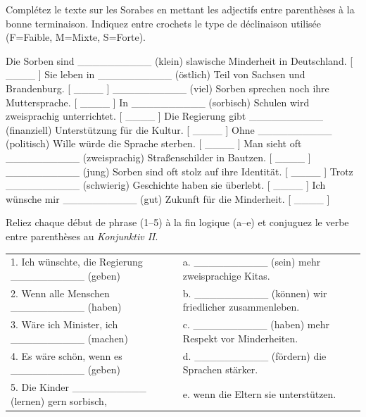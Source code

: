 \documentclass[11pt]{article}
\begin{document}
\begin{exercice}
Complétez le texte sur les Sorabes en mettant les adjectifs entre parenthèses à la bonne terminaison. Indiquez entre crochets le type de déclinaison utilisée (F=Faible, M=Mixte, S=Forte).
\begin{textebox}
Die Sorben sind \_\_\_\_\_\_\_\_\_\_ (klein) slawische Minderheit in Deutschland. [ \_\_\_\_ ]
Sie leben in \_\_\_\_\_\_\_\_\_\_ (östlich) Teil von Sachsen und Brandenburg. [ \_\_\_\_ ]
\_\_\_\_\_\_\_\_\_\_ (viel) Sorben sprechen noch ihre Muttersprache. [ \_\_\_\_ ]
In \_\_\_\_\_\_\_\_\_\_ (sorbisch) Schulen wird zweisprachig unterrichtet. [ \_\_\_\_ ]
Die Regierung gibt \_\_\_\_\_\_\_\_\_\_ (finanziell) Unterstützung für die Kultur. [ \_\_\_\_ ]
Ohne \_\_\_\_\_\_\_\_\_\_ (politisch) Wille würde die Sprache sterben. [ \_\_\_\_ ]
Man sieht oft \_\_\_\_\_\_\_\_\_\_ (zweisprachig) Straßenschilder in Bautzen. [ \_\_\_\_ ]
\_\_\_\_\_\_\_\_\_\_ (jung) Sorben sind oft stolz auf ihre Identität. [ \_\_\_\_ ]
Trotz \_\_\_\_\_\_\_\_\_\_ (schwierig) Geschichte haben sie überlebt. [ \_\_\_\_ ]
Ich wünsche mir \_\_\_\_\_\_\_\_\_\_ (gut) Zukunft für die Minderheit. [ \_\_\_\_ ]
\end{textebox}
\end{exercice}

\begin{exercice}
Reliez chaque début de phrase (1--5) à la fin logique (a--e) et conjuguez le verbe entre parenthèses au \emph{Konjunktiv II}.
\begin{center}
\begin{tabular}{|p{5cm}|p{5cm}|}
\hline
1. Ich wünschte, die Regierung \_\_\_\_\_\_\_\_\_\_ (geben) & a. \_\_\_\_\_\_\_\_\_\_ (sein) mehr zweisprachige Kitas. \\
2. Wenn alle Menschen \_\_\_\_\_\_\_\_\_\_ (haben) & b. \_\_\_\_\_\_\_\_\_\_ (können) wir friedlicher zusammenleben. \\
3. Wäre ich Minister, ich \_\_\_\_\_\_\_\_\_\_ (machen) & c. \_\_\_\_\_\_\_\_\_\_ (haben) mehr Respekt vor Minderheiten. \\
4. Es wäre schön, wenn es \_\_\_\_\_\_\_\_\_\_ (geben) & d. \_\_\_\_\_\_\_\_\_\_ (fördern) die Sprachen stärker. \\
5. Die Kinder \_\_\_\_\_\_\_\_\_\_ (lernen) gern sorbisch, & e. wenn die Eltern sie unterstützen. \\
\hline
\end{tabular}
\end{center}
\end{exercice}
\end{document}
